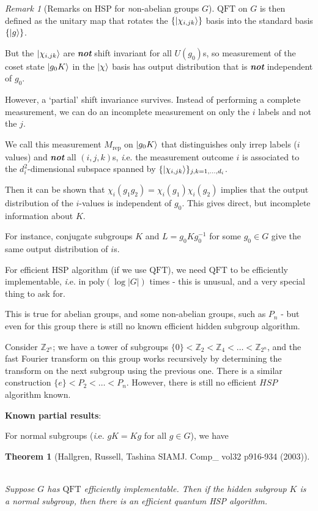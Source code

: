 \documentclass[]{article}
\DeclarePairedDelimiter\ket{\lvert}{\rangle}
\theoremstyle{custhm}
\theoremstyle{cusdef}
\theoremstyle{custhm}
\theoremstyle{custhm}
\theoremstyle{custhm}
\theoremstyle{custhm}
\newtheorem*{theorem*}{Theorem}
\theoremstyle{cusdef}
\theoremstyle{remark}
\newtheorem*{remark*}{Remark}
\newcommand{\Z}{\mathbb{Z}}
\newcommand{\undf}[1]{\textit{\textbf{#1}}}
\renewcommand{\it}[1]{\textit{#1}}
\newcommand{\qft}{\textrm{QFT}}
\newcommand{\poly}{\textrm{poly}}
\begin{document}
\begin{remark*}[Remarks on HSP for {\it non}-abelian groups $G$]
$\qft$ on $G$ is then defined as the unitary map that rotates the $\{\ket{\chi_{i,jk}}\}$ basis into the standard basis $\{\ket{g}\}$.

But the $\ket{\chi_{i,jk}}$ are \undf{not} shift invariant for all $U(g_0)$s, so measurement of the coset state $\ket{g_0 K}$ in the $\ket{\chi}$ basis has output distribution that is \undf{not} independent of $g_0$.

However, a `partial' shift invariance survives. Instead of performing a complete measurement, we can do an incomplete measurement on only the $i$ labels and not the $j$.

We call this measurement $M_{\textrm{rep}}$ on $\ket{g_0 K}$ that distinguishes only irrep labels ($i$ values) and \undf{not} all $(i,j,k)$s, {\it i.e.} the measurement outcome $i$ is associated to the $d_i^2$-dimensional subspace spanned by $\{\ket{\chi_{i,jk}}\}_{j,k=1,\dots,d_i}$.

Then it can be shown that $\chi_i(g_1g_2) = \chi_i(g_1)\chi_i(g_2)$ implies that the output distribution of the $i$-values is independent of $g_0$. This gives direct, but incomplete information about $K$.

For instance, conjugate subgroups $K$ and $L = g_0 Kg_0^{-1}$ for some $g_0 \in G$ give the same output distribution of $i$s.


For efficient HSP algorithm (if we use $\qft$), we need $\qft$ to be efficiently implementable, {\it i.e.} in $\poly(\log|G|)$ times - this is unusual, and a very special thing to ask for.

This is true for abelian groups, and some non-abelian groups, such as $P_n$ - but even for this group there is still no known efficient hidden subgroup algorithm.

Consider $\Z_{2^n}$; we have a tower of subgroups $\{0\} < \Z_2 < \Z_4 <\dots < \Z_{2^n}$, and the fast Fourier transform on this group works recursively by determining the transform on the next subgroup using the previous one. There is a similar construction $\{e\}<P_2 <\dots < P_n$. However, there is still no efficient $HSP$ algorithm known.

\textbf{Known partial results}:

For normal subgroups ({\it i.e.} $gK = Kg$ for all $g\in G$), we have
\begin{theorem*}[Hallgren, Russell, Tashina SIAMJ. Comp\_ vol32 p916-934 (2003)]\ 

Suppose $G$ has $\qft$ efficiently implementable. Then if the hidden subgroup $K$ is a normal subgroup, then there is an efficient quantum HSP algorithm.
\end{theorem*}


\end{remark*}
\end{document}

